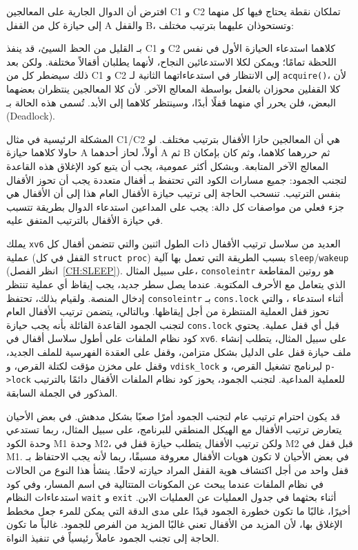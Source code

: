افترض أن الدوال الجارية على المعالجين C1 و C2 تملكان نقطة يحتاج فيها كل منهما إلى حيازة كل من القفل A والقفل B، وتستحوذان عليهما بترتيب مختلف:

بـ القليل من الحظ السيئ، قد ينفذ C1 و C2 كلاهما استدعاء الحيازة الأول في نفس اللحظة تمامًا؛ ويمكن لكلا الاستدعائين النجاح، لأنهما يطلبان أقفالاً مختلفة.
ولكن بعد ذلك سيضطر كل من C1 و C2 إلى الانتظار في استدعاءاتهما الثانية لـ {\tt acquire()}، لأن كلا القفلين محوزان بالفعل بواسطة المعالج الآخر.
لأن كلا المعالجين ينتظران بعضهما البعض، فلن يحرر أي منهما قفلًا أبدًا، وسينتظر كلاهما إلى الأبد.
تُسمى هذه الحالة بـ  (Deadlock).

المشكلة الرئيسية في مثال C1/C2 هي أن المعالجين حازا الأقفال بترتيب مختلف.
لو حاولا كلاهما حيازة A أولاً، لحاز أحدهما A ثم B ثم حررهما كلاهما، وثم كان بإمكان المعالج الآخر المتابعة.
وبشكل أكثر عمومية، يجب أن يتبع كود الإغلاق هذه القاعدة لتجنب الجمود: جميع مسارات الكود التي تحتفظ بـ أقفال متعددة يجب أن تحوز الأقفال بنفس الترتيب.
تنسحب الحاجة إلى ترتيب حيازة الأقفال العام هذا إلى أن الأقفال هي جزء فعلي من مواصفات كل دالة: يجب على المداعين استدعاء الدوال بطريقة تتسبب في حيازة الأقفال بالترتيب المتفق عليه.

يملك \texttt{xv6} العديد من سلاسل ترتيب الأقفال ذات الطول اثنين والتي تتضمن أقفال كل عملية (القفل في كل \lstinline{struct proc}) بسبب الطريقة التي تعمل بها آلية \lstinline{sleep}/\lstinline{wakeup} (انظر الفصل~\ref{CH:SLEEP}).
على سبيل المثال، \lstinline{consoleintr} هو روتين المقاطعة الذي يتعامل مع الأحرف المكتوبة.
عندما يصل سطر جديد، يجب إيقاظ أي عملية تنتظر إدخال المنصة.
ولقيام بذلك، تحتفظ \lstinline{consoleintr} بـ \lstinline{cons.lock} أثناء استدعاء ، والتي تحوز قفل العملية المنتظرة من أجل إيقاظها.
وبالتالي، يتضمن ترتيب الأقفال العام لتجنب الجمود القاعدة القائلة بأنه يجب حيازة \lstinline{cons.lock} قبل أي قفل عملية.
يحتوي كود نظام الملفات على أطول سلاسل أقفال في \texttt{xv6}.
على سبيل المثال، يتطلب إنشاء ملف حيازة قفل على الدليل بشكل متزامن، وقفل على العقدة الفهرسية للملف الجديد، وقفل على مخزن مؤقت لكتلة القرص، و \lstinline{vdisk_lock} لبرنامج تشغيل القرص، و \lstinline{p->lock} للعملية المداعية.
لتجنب الجمود، يحوز كود نظام الملفات الأقفال دائمًا بالترتيب المذكور في الجملة السابقة.

قد يكون احترام ترتيب عام لتجنب الجمود أمرًا صعبًا بشكل مدهش.
في بعض الأحيان يتعارض ترتيب الأقفال مع الهيكل المنطقي للبرنامج، على سبيل المثال، ربما تستدعي وحدة الكود M1 وحدة M2، ولكن ترتيب الأقفال يتطلب حيازة قفل في M2 قبل قفل في M1.
في بعض الأحيان لا تكون هويات الأقفال معروفة مسبقًا، ربما لأنه يجب الاحتفاظ بـ قفل واحد من أجل اكتشاف هوية القفل المراد حيازته لاحقًا.
ينشأ هذا النوع من الحالات في نظام الملفات عندما يبحث عن المكونات المتتالية في اسم المسار، وفي كود استدعاءات النظام {\tt wait} و {\tt exit} أثناء بحثهما في جدول العمليات عن العمليات الابن.
أخيرًا، غالبًا ما تكون خطورة الجمود قيدًا على مدى الدقة التي يمكن للمرء جعل مخطط الإغلاق بها، لأن المزيد من الأقفال تعني غالبًا المزيد من الفرص للجمود.
غالباً ما تكون الحاجة إلى تجنب الجمود عاملاً رئيسياً في تنفيذ النواة.

